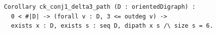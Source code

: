 \begin{lstlisting}[language=Rocq]
Corollary ck_conj1_delta3_path (D : orientedDigraph) :
  0 < #|D| -> (forall v : D, 3 <= outdeg v) ->
  exists x : D, exists s : seq D, dipath x s /\ size s = 6.
\end{lstlisting}
